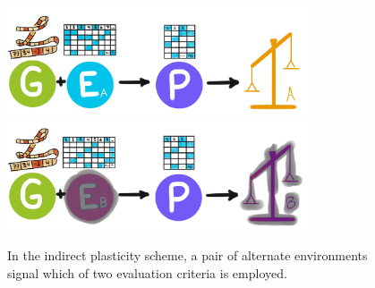 \begin{figure}
    \centering
    \includegraphics[width=0.8\textwidth]{img/indirectschemeA} \\
    \includegraphics[width=0.8\textwidth]{img/indirectschemeB}
  \caption{In the indirect plasticity scheme, a pair of alternate environments signal which of two evaluation criteria is employed.}
  \label{fig:indirect_plasticity_scheme}
\end{figure}